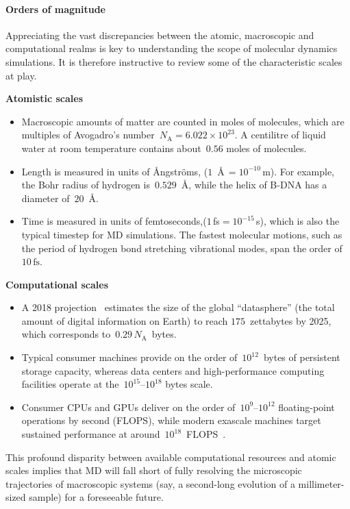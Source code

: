 \paragraph{Orders of magnitude}
{
Appreciating the vast discrepancies between the atomic, macroscopic and computational realms is key to understanding the scope of molecular dynamics simulations. It is therefore instructive to review some of the characteristic scales at play.

\noindent
\begin{minipage}[t]{0.48\textwidth}
\textbf{Atomistic scales}
\begin{itemize}
    \item Macroscopic amounts of matter are counted in moles of molecules, which are multiples of Avogadro's number~$N_{\mathrm{A}}=6.022\times 10^{23}$. A centilitre of liquid water at room temperature contains about~$0.56$ moles of molecules.
    \item Length is measured in units of {\AA ngstr\"oms}, ($1$~\AA$\,=10^{-10}\,\mathrm{m}$). For example, the Bohr radius of hydrogen is~$0.529$~\AA, while the helix of B-DNA has a diameter of~$20$~\AA.
    \item Time is measured in units of femtoseconds,($1$\,fs$=10^{-15}$\,s), which is also the typical timestep for MD simulations. The fastest molecular motions, such as the period of hydrogen bond stretching vibrational modes, span the order of~$10\,\mathrm{fs}$.
\end{itemize}
\end{minipage}\hfill
\begin{minipage}[t]{0.48\textwidth}
\textbf{Computational scales}
\begin{itemize}
  \item A 2018 projection~\cite{RGR18} estimates the size of the global ``datasphere'' (the total amount of digital information on Earth) to reach $175$~zettabytes by 2025, which corresponds to~$0.29\,N_{\mathrm{A}}$~bytes.
  \item Typical consumer machines provide on the order of~$10^{12}$~bytes of persistent storage capacity, whereas data centers and high-performance computing facilities operate at the~$10^{15}$--$10^{18}$ bytes scale.
  \item Consumer CPUs and GPUs deliver on the order of~$10^{9}$--$10^{12}$ floating-point operations by second (FLOPS), while modern exascale machines target sustained performance at around~$10^{18}$~FLOPS~\cite{Sc22}.
\end{itemize}
\end{minipage}
}
\newline\newline
\noindent   
This profound disparity between available computational resources and atomic scales implies that MD will fall short of fully resolving the microscopic trajectories of macroscopic systems (say, a second-long evolution of a millimeter-sized sample) for a foreseeable future.

